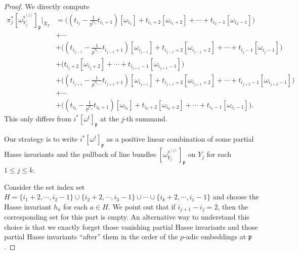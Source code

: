 \documentclass{article}
\begin{document}
\begin{proof}
We directly compute
\begin{equation}
\begin{aligned}
\pi_j^\ast[\omega^{\underline{s}^{(j)}}_{Y_j}]_\mathfrak{p}\Big|_{X_T}&=\Big((t_{i_1}-\frac{1}{p^{n_{i_1}}}t_{i_1+1})[\omega_{i_1}]+t_{i_1+2}[\omega_{i_1+2}]+\cdots + t_{i_2-1}[\omega_{i_2-1}]\Big)\\
&+\cdots\\
&+\Big((t_{i_{j-1}}-\frac{1}{p^{n_{i_{j-1}}}}t_{i_{j-1}+1})[\omega_{i_{j-1}}]+t_{i_{j-1}+2}[\omega_{i_{j-1}+2}]+\cdots + t_{i_j-1}[\omega_{i_j-1}]\Big)\\
&+\Big(t_{i_{j}+2}[\omega_{i_{j}+2}]+\cdots + t_{i_{j+1}-1}[\omega_{i_{j+1}-1}]\Big)\\
&+\Big((t_{i_{j+1}}-\frac{1}{p^{n_{i_{j+1}}}}t_{i_{j+1}+1})[\omega_{i_{j+1}}]+t_{i_{j+1}+2}[\omega_{i_{j+1}+2}]+\cdots + t_{i_{j+2}-1}[\omega_{i_{j+2}-1}]\Big)\\
&+\cdots\\
&+\Big((t_{i_k}-\frac{1}{p^{n_{i_k}}}t_{i_k+1})[\omega_{i_k}]+t_{i_k+2}[\omega_{i_k+2}]+\cdots + t_{i_1-1}[\omega_{i_1-1}]\Big).
\end{aligned}
\end{equation}
This only differs from $i^\ast[\omega^{\underline{t}}]_\mathfrak{p}$ at the $j$-th summand.

Our strategy is to write $i^\ast[\omega^{\underline{t}}]_\mathfrak{p}$ as a positive linear combination of some partial Hasse invariants and the pullback of line bundles $[\omega^{\underline{s}^{(j)}}_{Y_j}]_\mathfrak{p}$ on $Y_j$ for each $1\le j\le k$. 

Consider the set index set $H=\{i_{1}+2,\cdots,i_2-1\}\cup\{i_2+2,\cdots,i_3-1\}\cup\cdots\cup\{i_k+2,\cdots,i_1-1\}$ and choose the Hasse invariant $h_a$ for each $a\in H$. We point out that if $i_{j+1}-i_j=2$, then the corresponding set for this part is empty. An alternative way to understand this choice is that we exactly forget those vanishing partial Hasse invariants and those partial Hasse invariants ``after'' them in the order of the $p$-adic embeddings at $\mathfrak{p}$.


\end{proof}
\end{document}
